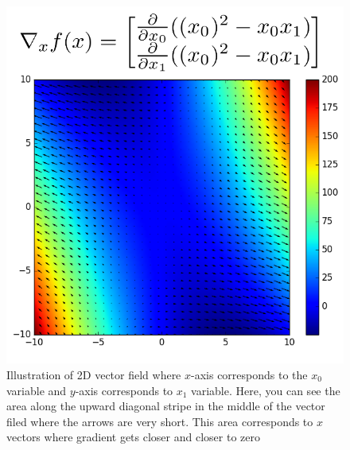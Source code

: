 \documentclass[paper=a4, fontsize=11pt]{scrartcl}
\numberwithin{equation}{section}		%
\numberwithin{figure}{section}			%
\numberwithin{table}{section}			%
\begin{document}
\begin{figure}[!htb]
	\centering
    \includegraphics[scale=0.6]{Quiver_edited.png}
    \caption{Illustration of 2D  vector field where $x$-axis corresponds to the $x_0$ variable  and $y$-axis corresponds to $x_1$ variable. Here, you can see the area along the upward diagonal stripe in the middle of the vector filed where the arrows are very short. This area corresponds to $ x $ vectors where gradient gets closer and closer to zero}
    \label{fig:Quiver_gradient}
\end{figure}
\end{document}
